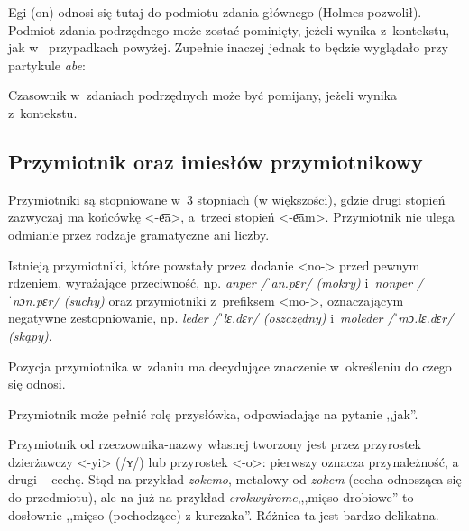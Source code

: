 \begin{spacing}{1.1}
Egi (on) odnosi się tutaj do podmiotu zdania głównego (Holmes pozwolił). Podmiot
zdania podrzędnego może zostać pominięty, jeżeli wynika z~kontekstu, jak w~
przypadkach powyżej. Zupełnie inaczej jednak to będzie wyglądało przy partykule
\emph{abe}:


Czasownik w~zdaniach podrzędnych może być pomijany, jeżeli wynika z~kontekstu.


\subsection{Przymiotnik oraz imiesłów przymiotnikowy}

Przymiotniki są stopniowane w~3 stopniach (w większości), gdzie drugi stopień
zazwyczaj ma końcówkę <-e͞a>, a~trzeci stopień <-e͞am>. Przymiotnik nie ulega
odmianie przez rodzaje gramatyczne ani liczby.

Istnieją przymiotniki, które powstały przez dodanie <no-> przed pewnym rdzeniem,
wyrażające przeciwność, np. \emph{anper /ˈan.pɛr/ (mokry)} i~\emph{nonper
/ˈnɔn.pɛr/ (suchy)} oraz przymiotniki z~prefiksem <mo->, oznaczającym negatywne
zestopniowanie, np. \emph{leder /ˈlɛ.dɛr/ (oszczędny)} i~\emph{moleder
/ˈmɔ.lɛ.dɛr/ (skąpy)}.

Pozycja przymiotnika w~zdaniu ma decydujące znaczenie w~określeniu do czego się
odnosi.





Przymiotnik może pełnić rolę przysłówka, odpowiadając na pytanie ,,jak''.


Przymiotnik od rzeczownika-nazwy własnej tworzony jest przez przyrostek
dzierżawczy <-yi> (/ʏ/) lub przyrostek <-o>: pierwszy oznacza przynależność, a
drugi -- cechę. Stąd na przykład \emph{zokemo}, metalowy od \emph{zokem} (cecha
odnosząca się do przedmiotu), ale na już na przykład \emph{erokwyirome},,,mięso
drobiowe'' to dosłownie ,,mięso (pochodzące) z kurczaka''. Różnica ta jest
bardzo delikatna.


\end{spacing}
